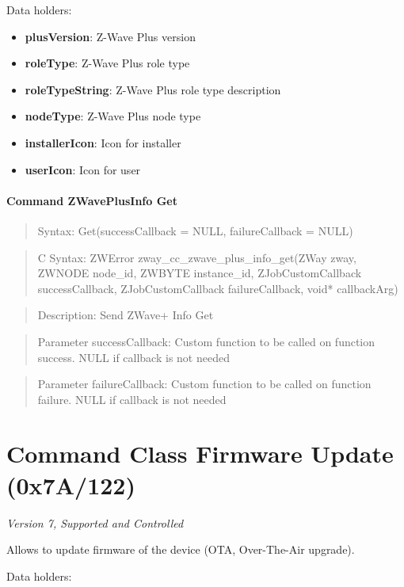 \noindent
Data holders:

\begin{itemize}
\item \textbf{plusVersion}: Z-Wave Plus version
\item \textbf{roleType}: Z-Wave Plus role type
\item \textbf{roleTypeString}: Z-Wave Plus role type description
\item \textbf{nodeType}: Z-Wave Plus node type
\item \textbf{installerIcon}: Icon for installer
\item \textbf{userIcon}: Icon for user
\end{itemize}

\paragraph{Command ZWavePlusInfo Get}
\begin{quote}Syntax: Get(successCallback = NULL, failureCallback = NULL)\end{quote}
\begin{quote}C Syntax: ZWError zway\_cc\_zwave\_plus\_info\_get(ZWay zway, ZWNODE node\_id, ZWBYTE instance\_id, ZJobCustomCallback successCallback, ZJobCustomCallback failureCallback, void* callbackArg)\end{quote}
\begin{quote}Description: Send ZWave+ Info Get\end{quote}
\begin{quote}Parameter successCallback: Custom function to be called on function success. NULL if callback is not needed\end{quote}
\begin{quote}Parameter failureCallback: Custom function to be called on function failure. NULL if callback is not needed\end{quote}



\section{Command Class Firmware Update (0x7A/122)}

\textit{Version 7, Supported and Controlled}
\newline

Allows to update firmware of the device (OTA, Over-The-Air upgrade).
\newline

\noindent
Data holders:

